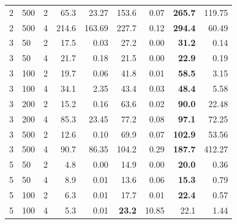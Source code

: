 \documentclass[runningheads]{llncs}
\begin{document}
\begin{table}[!ht]
{\begin{tabular}{lll|rr|rr|rr}
 			2 &      500 &         2 &            65.3 &        23.27 &                    153.6 &                  0.07 &        \textbf{265.7} &    119.75 \\
 			2 &      500 &         4 &           214.6 &       163.69 &                    227.7 &                  0.12 &        \textbf{294.4} &     60.49 \\ \hline
 			3 &       50 &         2 &            17.5 &         0.03 &                     27.2 &                  0.00 &         \textbf{31.2} &      0.14 \\
 			3 &       50 &         4 &            21.7 &         0.18 &                     21.5 &                  0.00 &         \textbf{22.9} &      0.19 \\
 			3 &      100 &         2 &            19.7 &         0.06 &                     41.8 &                  0.01 &         \textbf{58.5} &      3.15 \\
 			3 &      100 &         4 &            34.1 &         2.35 &                     43.4 &                  0.03 &         \textbf{48.4} &      5.58 \\
 			3 &      200 &         2 &            15.2 &         0.16 &                     63.6 &                  0.02 &         \textbf{90.0} &     22.48 \\
 			3 &      200 &         4 &            85.3 &        23.45 &                     77.2 &                  0.08 &         \textbf{97.1} &     72.25 \\
 			3 &      500 &         2 &            12.6 &         0.10 &                     69.9 &                  0.07 &        \textbf{102.9} &     53.56 \\
 			3 &      500 &         4 &            90.7 &        86.35 &                    104.2 &                  0.29 &        \textbf{187.7} &    412.27 \\ \hline
 			5 &       50 &         2 &             4.8 &         0.00 &                     14.9 &                  0.00 &         \textbf{20.0} &      0.36 \\
 			5 &       50 &         4 &             8.9 &         0.01 &                     13.6 &                  0.06 &         \textbf{15.3} &      0.79 \\
 			5 &      100 &         2 &             6.3 &         0.01 &                     17.7 &                  0.01 &         \textbf{22.4} &      0.57 \\
 			5 &      100 &         4 &             5.3 &         0.01 &                     \textbf{23.2} &                 10.85 &         22.1 &      1.44 \\

\end{tabular}}
\end{table}
\end{document}
